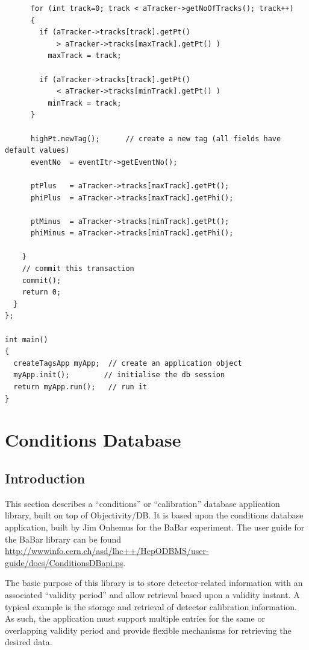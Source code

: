 \begin{verbatim}
      for (int track=0; track < aTracker->getNoOfTracks(); track++) 
      { 
        if (aTracker->tracks[track].getPt() 
            > aTracker->tracks[maxTrack].getPt() ) 
          maxTrack = track; 

        if (aTracker->tracks[track].getPt() 
            < aTracker->tracks[minTrack].getPt() ) 
          minTrack = track; 
      } 
  
      highPt.newTag();      // create a new tag (all fields have default values) 
      eventNo  = eventItr->getEventNo(); 
  
      ptPlus   = aTracker->tracks[maxTrack].getPt(); 
      phiPlus  = aTracker->tracks[maxTrack].getPhi(); 

      ptMinus  = aTracker->tracks[minTrack].getPt(); 
      phiMinus = aTracker->tracks[minTrack].getPhi(); 
  
    } 
    // commit this transaction 
    commit(); 
    return 0; 
  } 
}; 

int main() 
{ 
  createTagsApp myApp;  // create an application object 
  myApp.init();        // initialise the db session 
  return myApp.run();   // run it 
} 
\end{verbatim}
\chapter{Conditions Database\label{H1ConditionsDatabase}}
\section{Introduction}

\par
This section describes a ``conditions'' or ``calibration''
database application library, built on top of Objectivity/DB. It is based upon the
conditions database application, built by Jim Onhemus for the BaBar experiment.
The user guide for the BaBar library can be found 
\url{http://wwwinfo.cern.ch/asd/lhc++/HepODBMS/user-guide/docs/ConditionsDBapi.ps}.

\par

The basic purpose of this library is to store detector-related information
with an associated ``validity period'' and allow retrieval based upon a
validity instant. A typical example is the storage and retrieval of detector
calibration information. As such, the application must support multiple entries
for the same or overlapping validity period and provide flexible mechanisms for
retrieving the desired data.
